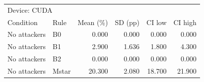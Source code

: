 \begin{tabular}{llrrrr}
\toprule
\multicolumn{6}{l}{Device: CUDA} \\
Condition & Rule & Mean (\%) & SD (pp) & CI low & CI high \\
\midrule
No attackers & B0 & 0.000 & 0.000 & 0.000 & 0.000 \\
No attackers & B1 & 2.900 & 1.636 & 1.800 & 4.300 \\
No attackers & B2 & 0.000 & 0.000 & 0.000 & 0.000 \\
No attackers & Mstar & 20.300 & 2.080 & 18.700 & 21.900 \\
\bottomrule
\end{tabular}
